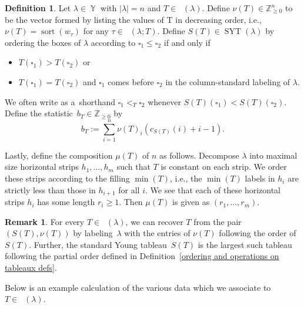 \documentclass[10pt,a4paper]{amsart}
\numberwithin{equation}{section}
\theoremstyle{definition}
\newtheorem{Definition}[Theorem]{Definition}
\newtheorem{Remark}[Theorem]{Remark}
\DeclareMathOperator{\Par}{\mathbb{Y}}
\DeclareMathOperator{\RYT}{\mathrm{RYT}_{\geq 0}}
\DeclareMathOperator{\SYT}{\mathrm{SYT}}
\DeclareMathOperator{\PSYT}{\mathrm{PSYT}_{\geq 0}}
\DeclareMathOperator{\sort}{sort}
\DeclareMathOperator{\Min}{\mathrm{min}}
\begin{document}
\begin{Definition}\label{decomposing RYT into SYT and partition}
Let $\lambda \in \Par$ with $|\lambda| = n$ and $T \in \RYT(\lambda)$. Define $\nu(T) \in \mathbb{Z}_{\geq 0}^{n}$ to be the vector formed by listing the values of T in decreasing order, i.e., $\nu(T) = \sort(w_{\tau})$ for any $\tau \in \PSYT(\lambda;T)$. Define $S(T) \in \SYT(\lambda)$ by ordering the boxes of $\lambda$ according to $\square_1 \leq \square_2$ if and only if
\begin{itemize}
\itemsep=0pt
 \item $T(\square_1) > T(\square_2)$ or
 \item $T(\square_1) = T(\square_2)$ and $\square_1$ comes before $\square_2$ in the column-standard labeling of $\lambda$.
\end{itemize}
We often write as a~shorthand $\square_1 <_{T} \square_2$ whenever $S(T)(\square_1) < S(T)(\square_2)$.
Define the statistic~${b_T \in \mathbb{Z}_{\geq 0}}$ by
\[
b_T:= \sum_{i=1}^{n} \nu(T)_i( c_{S(T)}(i) + i-1).
\]

Lastly, define the composition $\mu(T)$ of $n$ as follows. Decompose $\lambda$ into maximal size horizontal strips $h_1,\dots, h_m$ such that $T$ is constant on each strip. We order these strips according to the filling $\Min(T)$, i.e., the $\Min(T)$ labels in $h_i$ are strictly less than those in $h_{i+1}$ for all $i$. We see that each of these horizontal strips $h_i$ has some length $r_i\geq 1$. Then $\mu(T)$ is given as $(r_1,\dots, r_m)$.
\end{Definition}

\begin{Remark}
 For every $T \in \RYT(\lambda)$, we can recover $T$ from the pair $(S(T),\nu(T))$ by labeling~$\lambda$ with the entries of $\nu(T)$ following the order of $S(T)$. Further, the standard Young tableau~$S(T)$ is the largest such tableau following the partial order defined in Definition~\ref{ordering and operations on tableaux defs}.
\end{Remark}

Below is an example calculation of the various data which we associate to $T \in \RYT(\lambda)$.
\end{document}
